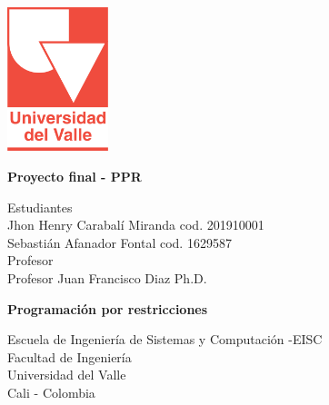 \begin{titlepage}
    \begin{center}
        \vspace*{1cm}

        \includegraphics[width=0.22\textwidth]{img/universidadDelValle.png}
        
        \vfill
        \textbf{Proyecto final - PPR}\\
        \vfill
        
        Estudiantes\\
        Jhon Henry Carabalí Miranda cod. 201910001\\
        Sebastián Afanador Fontal cod. 1629587\\
        \vfill
        Profesor\\
        Profesor Juan Francisco Diaz Ph.D.\\
        
        \vfill

        \textbf{Programación por restricciones}
        
        \vfill
           
        Escuela de Ingeniería de Sistemas y Computación -EISC\\
        Facultad de Ingeniería\\
        Universidad del Valle\\
        Cali - Colombia\\
        \vfill
        \date{05 de Agosto del 2022}

    \end{center}
\end{titlepage}